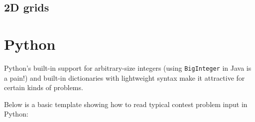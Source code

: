 \documentclass[10pt]{book}
\newcommand{\pycode}[1]{\inputminted[fontsize=\normalsize]{python}{code/#1}}
\newif\iftodos
\newcommand{\todo}[1]{\iftodos\textcolor{red}{[TODO: #1]}\fi}
\begin{document}
\todo{Monoid vs group}
\todo{Prefix sum trick}
\todo{2D prefix sum trick with PIE}
\todo{Kadena's Algorithm for max subsequence sum}
\todo{Segment trees, Fenwick trees}

\section{2D grids}

\todo{Discussion of implicit graphs}
\todo{Formulas for converting between pair of coordinates and single index}
\todo{Trick for listing neighbors with delta vector}

\chapter{Python} \label{chap:python}

Python's built-in support for arbitrary-size integers (using
\texttt{BigInteger} in Java is a pain!) and built-in dictionaries with
lightweight syntax make it attractive for certain kinds of problems.

Below is a basic template showing how to read typical contest problem
input in Python:

\pycode{python/template.py}

\todo{Mention basic Python data structures such as set, deque, list methods}
\end{document}
